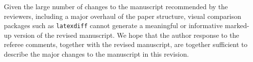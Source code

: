 \documentclass[]{article}
\title{}
\author{}
\begin{document}
\maketitle

Given the large number of changes to the manuscript recommended by the reviewers, including a major overhaul of the paper structure, visual comparison packages such as \texttt{latexdiff} cannot generate a meaningful or informative marked-up version of the revised manuscript. We hope that the author response to the referee comments, together with the revised manuscript, are together sufficient to describe the major changes to the manuscript in this revision.
\end{document}
